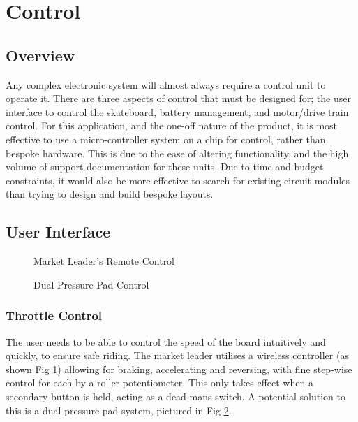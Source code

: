 \documentclass[journal,10pt]{IEEEtran}
\begin{document}
    
\section{Control}
    \subsection{Overview}
    	Any complex electronic system will almost always require a control unit to operate it.
    	There are three aspects of control that must be designed for; the user interface to control the skateboard, battery management, and motor/drive train control.
    	For this application, and the one-off nature of the product, it is most effective to use a micro-controller system on a chip for control, rather than bespoke hardware.
    	This is due to the ease of altering functionality, and the high volume of support documentation for these units.
    	Due to time and budget constraints, it would also be more effective to search for existing circuit modules than trying to design and build bespoke layouts.
    \subsection{User Interface}
        \begin{figure}[H]
            \centering
            \caption{Market Leader's Remote Control}
            \label{fig:Boosted Remote}
        \end{figure}
        \begin{figure}[H]
            \centering
            \caption{Dual Pressure Pad Control}
            \label{fig:Pressure Pads}
        \end{figure}
            
    	\subsubsection{Throttle Control}
    		The user needs to be able to control the speed of the board intuitively and quickly, to ensure safe riding.
    		The market leader utilises a wireless controller (as shown Fig \ref{fig:Boosted Remote}) allowing for braking, accelerating and reversing, with fine step-wise control for each by a roller potentiometer.
    		This only takes effect when a secondary button is held, acting as a dead-mans-switch.
    		A potential solution to this is a dual pressure pad system, pictured in Fig \ref{fig:Pressure Pads}.
            
\end{document}
